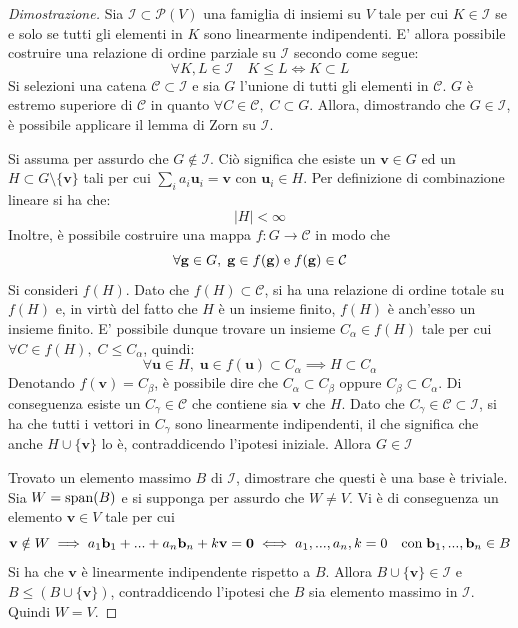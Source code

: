 \documentclass{article}
\begin{document}
    \begin{proof}[Dimostrazione]
        Sia $\mathcal{I} \subset \mathcal{P}(V)$ una famiglia di insiemi su $V$ tale per cui $K \in \mathcal{I}$ se e solo se tutti gli elementi in $K$ sono linearmente indipendenti.
        E' allora possibile costruire una relazione di ordine parziale su $\mathcal{I}$ secondo come segue:
        \[
            \forall K, L \in \mathcal{I} \quad K \leq L \iff K \subset L
        \]
        Si selezioni una catena $\mathcal{C} \subset \mathcal{I}$ e sia $G$ l'unione di tutti gli elementi in $\mathcal{C}$.
        $G$ è estremo superiore di $\mathcal{C}$ in quanto $\forall C \in \mathcal{C}, \; C \subset G$. Allora, dimostrando che $G \in \mathcal{I}$, è possibile applicare il lemma di Zorn su $\mathcal{I}$.

        \vspace{5pt}
        Si assuma per assurdo che $G \notin \mathcal{I}$. Ciò significa che esiste un $\mathbf{v} \in G$ ed un $H \subset G \setminus \{\mathbf{v}\}$ tali per cui $\sum_{i} a_{i} \mathbf{u}_{i} = \mathbf{v}$ con $\mathbf{u}_{i} \in H$. Per definizione di combinazione lineare si ha che:
        \[
            |H| < \infty
        \]
        Inoltre, è possibile costruire una mappa $f: G \rightarrow \mathcal{C}$ in modo che
        \[
            \forall \mathbf{g} \in G, \; \mathbf{g} \in f(\mathbf{g}) \; \textnormal{e} \; f(\mathbf{g}) \in \mathcal{C} 
        \]
        Si consideri $f(H)$. Dato che $f(H) \subset \mathcal{C}$, si ha una relazione di ordine totale su $f(H)$ e, in virtù del fatto che $H$ è un insieme finito, $f(H)$ è anch'esso un insieme finito.
        E' possibile dunque trovare un insieme $C_{\alpha} \in f(H)$ tale per cui $\forall C \in f(H), \; C \leq C_{\alpha}$, quindi:
        \[
            \forall \mathbf{u} \in H, \; \mathbf{u} \in f(\mathbf{u}) \subset C_{\alpha} \implies H \subset C_{\alpha}
        \]
        Denotando $f(\mathbf{v}) = C_{\beta}$, è possibile dire che $C_{\alpha} \subset C_{\beta}$ oppure $C_{\beta} \subset C_{\alpha}$. Di conseguenza esiste un $C_{\gamma} \in \mathcal{C}$ che contiene sia $\mathbf{v}$ che $H$. Dato che $C_{\gamma} \in \mathcal{C} \subset \mathcal{I}$, si ha che tutti i vettori in $C_{\gamma}$ sono
        linearmente indipendenti, il che significa che anche $H \cup \{\mathbf{v}\}$ lo è, contraddicendo l'ipotesi iniziale. Allora $G \in \mathcal{I}$ 

        \vspace{10pt}
        Trovato un elemento massimo $B$ di $\mathcal{I}$, dimostrare che questi è una base è triviale. Sia $W = \textnormal{span}(B)$ e si supponga per assurdo che 
        $W \neq V$. Vi è di conseguenza un elemento $\mathbf{v} \in V$ tale per cui 
        \[
            \mathbf{v} \notin W \implies a_1 \mathbf{b}_{1} + ... + a_n \mathbf{b}_{n} + k \mathbf{v} = \mathbf{0} \iff a_1, ..., a_n, k = 0 \quad \textnormal{con} \; \mathbf{b}_{1}, ..., \mathbf{b}_{n} \in B
        \]
        Si ha che $\mathbf{v}$ è linearmente indipendente rispetto a $B$. Allora $B \cup \{\mathbf{v}\} \in \mathcal{I}$ e $B \leq (B \cup \{\mathbf{v}\})$, contraddicendo l'ipotesi che $B$ sia elemento massimo in $\mathcal{I}$. Quindi $W = V$.


\end{proof}
\end{document}

